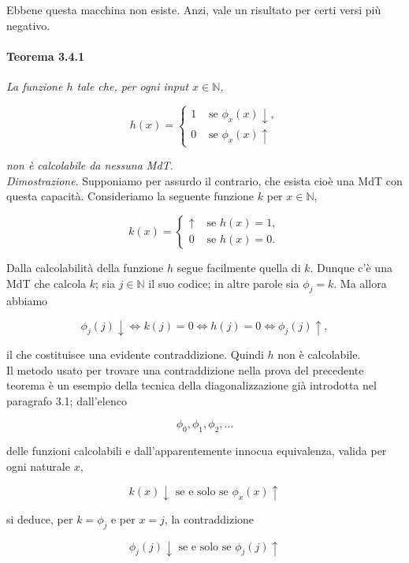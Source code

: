 Ebbene questa macchina non esiste. Anzi, vale un risultato per certi versi più
negativo.

\paragraph{Teorema 3.4.1} \textit{La funzione $h$ tale che, per ogni input $x \in
        \mathbb{N}$,}

\[
    h(x)= \begin{cases}1 & \text { se } \phi_x(x) \downarrow, \\ 0 & \text { se } \phi_x(x) \uparrow\end{cases}
\]

\textit{non è calcolabile da nessuna MdT.}\\

\textit{Dimostrazione}. Supponiamo per assurdo il
contrario, che esista cioè una MdT con questa capacità. Consideriamo la seguente
funzione $k$ per $x \in \mathbb{N}$,

\[
    k(x)= \begin{cases}\uparrow & \text { se } h(x)=1, \\ 0 & \text { se } h(x)=0 .\end{cases}
\]

Dalla calcolabilità della funzione $h$ segue facilmente quella di $k$. Dunque
c'è una MdT che calcola $k$; sia $j \in \mathbb{N}$ il suo codice; in altre
parole sia $\phi_j=k$. Ma allora abbiamo

\[
    \phi_j(j) \downarrow \Longleftrightarrow k(j)=0 \Longleftrightarrow h(j)=0 \Longleftrightarrow \phi_j(j) \uparrow,
\]

il che costituisce una evidente contraddizione. Quindi $h$ non è calcolabile.\\

Il
metodo usato per trovare una contraddizione nella prova del precedente teorema è
un esempio della tecnica della diagonalizzazione già introdotta nel paragrafo
3.1; dall'elenco

\[
    \phi_0, \phi_1, \phi_2, \ldots
\]

delle funzioni calcolabili e dall'apparentemente innocua equivalenza, valida per
ogni naturale $x$,

\[
    k(x) \downarrow \text { se e solo se } \phi_x(x) \uparrow
\]

si deduce, per $k=\phi_j$ e per $x=j$, la contraddizione

\[
    \phi_j(j) \downarrow \text { se e solo se } \phi_j(j) \uparrow
\]

